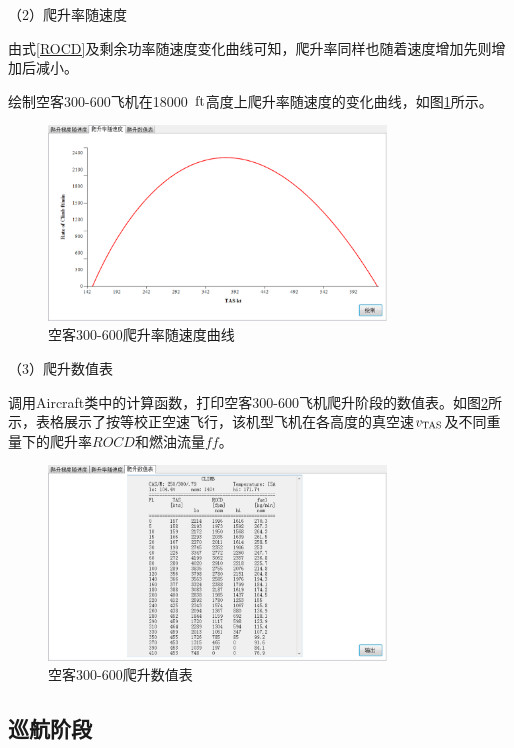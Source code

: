 \documentclass[a4paper,punct,space,heading=true,AutoFakeBold]{ctexrep}
\begin{document}
（2）爬升率随速度

由式\ref{ROCD}及剩余功率随速度变化曲线可知，爬升率同样也随着速度增加先则增加后减小。

绘制空客300-600飞机在18000\ $\rm ft$高度上爬升率随速度的变化曲线，如图\ref{roc}所示。

\begin{figure}[h]
	\centering
	\includegraphics[width=0.8\textwidth]{pic/roc.eps}\hspace{30pt}
	\caption{空客300-600爬升率随速度曲线}\label{roc}
\end{figure}

（3）爬升数值表

调用Aircraft类中的计算函数，打印空客300-600飞机爬升阶段的数值表。如图\ref{climbtable}所示，表格展示了按等校正空速飞行，该机型飞机在各高度的真空速$v_{\rm TAS}$及不同重量下的爬升率$ROCD$和燃油流量$ff$。

\begin{figure}[h]
	\centering
	\includegraphics[width=0.8\textwidth]{pic/climbtable.eps}\hspace{30pt}
	\caption{空客300-600爬升数值表}\label{climbtable}
\end{figure}


\subsection{巡航阶段}
\end{document}
